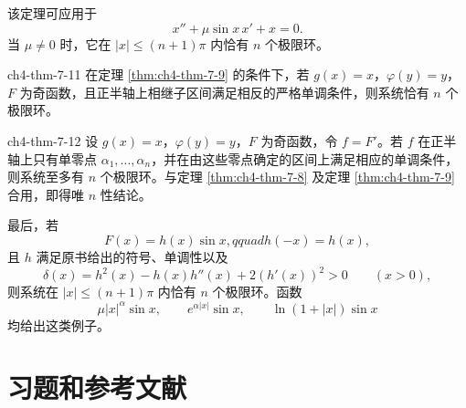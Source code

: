 
该定理可应用于
\[
x''+\mu\sin x\,x'+x=0.
\]
当 $\mu\ne0$ 时，它在 $|x|\leqslant(n+1)\pi$ 内恰有 $n$ 个极限环。

\begin{theorem}{}{ch4-thm-7-11}
在定理 \ref{thm:ch4-thm-7-9} 的条件下，若 $g(x)=x$，$\varphi(y)=y$，$F$ 为奇函数，且正半轴上相继子区间满足相反的严格单调条件，则系统恰有 $n$ 个极限环。
\end{theorem}

\begin{theorem}{}{ch4-thm-7-12}
设 $g(x)=x$，$\varphi(y)=y$，$F$ 为奇函数，令 $f=F'$。若 $f$ 在正半轴上只有单零点 $\alpha_1,\ldots,\alpha_n$，并在由这些零点确定的区间上满足相应的单调条件，则系统至多有 $n$ 个极限环。与定理 \ref{thm:ch4-thm-7-8} 及定理 \ref{thm:ch4-thm-7-9} 合用，即得唯 $n$ 性结论。
\end{theorem}

最后，若
\[
F(x)=h(x)\sin x,qquad h(-x)=h(x),
\]
且 $h$ 满足原书给出的符号、单调性以及
\[
\delta(x)=h^2(x)-h(x)h''(x)+2(h'(x))^2>0\qquad(x>0),
\]
则系统在 $|x|\leqslant(n+1)\pi$ 内恰有 $n$ 个极限环。函数
\[
\mu|x|^\alpha\sin x,\qquad e^{\alpha|x|}\sin x,
\qquad \ln(1+|x|)\sin x
\]
均给出这类例子。

\section*{习题和参考文献}

